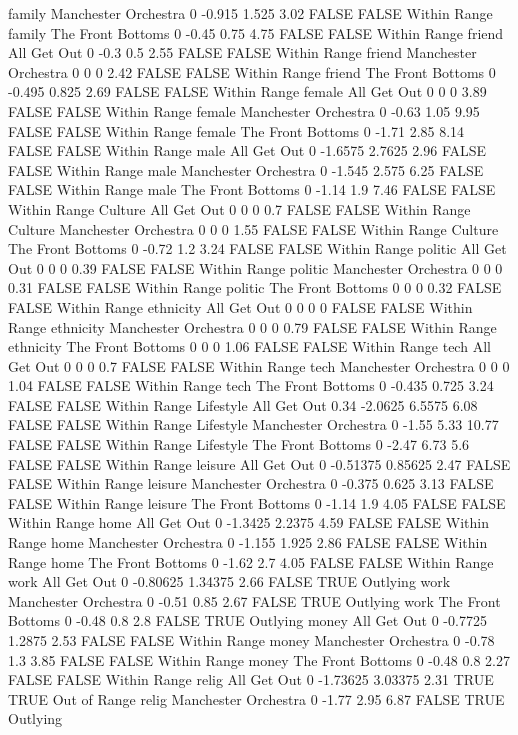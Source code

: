 family Manchester Orchestra 0 -0.915 1.525 3.02 FALSE FALSE Within Range
family The Front Bottoms 0 -0.45 0.75 4.75 FALSE FALSE Within Range
friend All Get Out 0 -0.3 0.5 2.55 FALSE FALSE Within Range
friend Manchester Orchestra 0 0 0 2.42 FALSE FALSE Within Range
friend The Front Bottoms 0 -0.495 0.825 2.69 FALSE FALSE Within Range
female All Get Out 0 0 0 3.89 FALSE FALSE Within Range
female Manchester Orchestra 0 -0.63 1.05 9.95 FALSE FALSE Within Range
female The Front Bottoms 0 -1.71 2.85 8.14 FALSE FALSE Within Range
male All Get Out 0 -1.6575 2.7625 2.96 FALSE FALSE Within Range
male Manchester Orchestra 0 -1.545 2.575 6.25 FALSE FALSE Within Range
male The Front Bottoms 0 -1.14 1.9 7.46 FALSE FALSE Within Range
Culture All Get Out 0 0 0 0.7 FALSE FALSE Within Range
Culture Manchester Orchestra 0 0 0 1.55 FALSE FALSE Within Range
Culture The Front Bottoms 0 -0.72 1.2 3.24 FALSE FALSE Within Range
politic All Get Out 0 0 0 0.39 FALSE FALSE Within Range
politic Manchester Orchestra 0 0 0 0.31 FALSE FALSE Within Range
politic The Front Bottoms 0 0 0 0.32 FALSE FALSE Within Range
ethnicity All Get Out 0 0 0 0 FALSE FALSE Within Range
ethnicity Manchester Orchestra 0 0 0 0.79 FALSE FALSE Within Range
ethnicity The Front Bottoms 0 0 0 1.06 FALSE FALSE Within Range
tech All Get Out 0 0 0 0.7 FALSE FALSE Within Range
tech Manchester Orchestra 0 0 0 1.04 FALSE FALSE Within Range
tech The Front Bottoms 0 -0.435 0.725 3.24 FALSE FALSE Within Range
Lifestyle All Get Out 0.34 -2.0625 6.5575 6.08 FALSE FALSE Within Range
Lifestyle Manchester Orchestra 0 -1.55 5.33 10.77 FALSE FALSE Within Range
Lifestyle The Front Bottoms 0 -2.47 6.73 5.6 FALSE FALSE Within Range
leisure All Get Out 0 -0.51375 0.85625 2.47 FALSE FALSE Within Range
leisure Manchester Orchestra 0 -0.375 0.625 3.13 FALSE FALSE Within Range
leisure The Front Bottoms 0 -1.14 1.9 4.05 FALSE FALSE Within Range
home All Get Out 0 -1.3425 2.2375 4.59 FALSE FALSE Within Range
home Manchester Orchestra 0 -1.155 1.925 2.86 FALSE FALSE Within Range
home The Front Bottoms 0 -1.62 2.7 4.05 FALSE FALSE Within Range
work All Get Out 0 -0.80625 1.34375 2.66 FALSE TRUE Outlying
work Manchester Orchestra 0 -0.51 0.85 2.67 FALSE TRUE Outlying
work The Front Bottoms 0 -0.48 0.8 2.8 FALSE TRUE Outlying
money All Get Out 0 -0.7725 1.2875 2.53 FALSE FALSE Within Range
money Manchester Orchestra 0 -0.78 1.3 3.85 FALSE FALSE Within Range
money The Front Bottoms 0 -0.48 0.8 2.27 FALSE FALSE Within Range
relig All Get Out 0 -1.73625 3.03375 2.31 TRUE TRUE Out of Range
relig Manchester Orchestra 0 -1.77 2.95 6.87 FALSE TRUE Outlying

